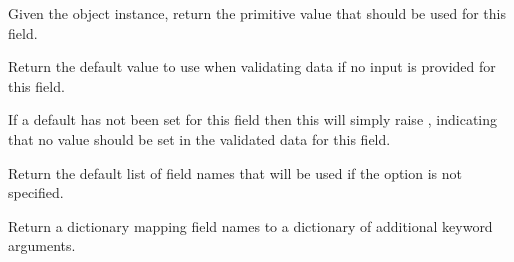 \documentclass[letterpaper,10pt,english]{sphinxmanual}
\begin{document}
\begin{fulllineitems}
\begin{fulllineitems}
\label{\detokenize{tasks:tasks.serializers.TaskSerializer.get_attribute}}
\pysigstartsignatures
{}
\pysigstopsignatures
\sphinxAtStartPar
Given the  object instance, return the primitive value
that should be used for this field.

\end{fulllineitems}


\begin{fulllineitems}
\label{\detokenize{tasks:tasks.serializers.TaskSerializer.get_default}}
\pysigstartsignatures
{}
\pysigstopsignatures
\sphinxAtStartPar
Return the default value to use when validating data if no input
is provided for this field.

\sphinxAtStartPar
If a default has not been set for this field then this will simply
raise , indicating that no value should be set in the
validated data for this field.

\end{fulllineitems}


\begin{fulllineitems}
\label{\detokenize{tasks:tasks.serializers.TaskSerializer.get_default_field_names}}
\pysigstartsignatures
{}
\pysigstopsignatures
\sphinxAtStartPar
Return the default list of field names that will be used if the
 option is not specified.

\end{fulllineitems}


\begin{fulllineitems}
\label{\detokenize{tasks:tasks.serializers.TaskSerializer.get_extra_kwargs}}
\pysigstartsignatures
{}
\pysigstopsignatures
\sphinxAtStartPar
Return a dictionary mapping field names to a dictionary of
additional keyword arguments.


\end{fulllineitems}
\end{fulllineitems}
\end{document}
